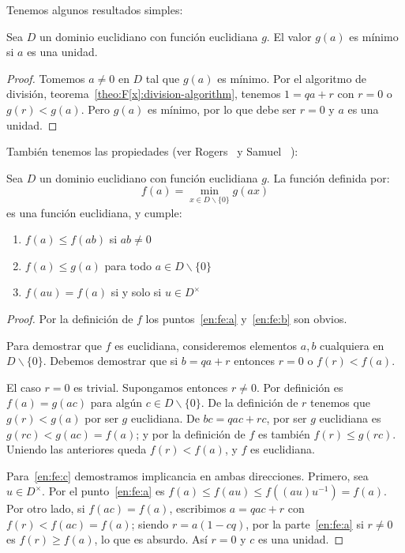   Tenemos algunos resultados simples:
  \begin{theorem}
    \label{theo:ED:g-minimo=>unidad}
    Sea \(D\) un dominio euclidiano con función euclidiana \(g\).
    El valor \(g(a)\) es mínimo si \(a\) es una unidad.
  \end{theorem}
  \begin{proof}
    Tomemos \(a \ne 0\) en \(D\) tal que \(g(a)\) es mínimo.
    Por el algoritmo de división,
    teorema~\ref{theo:F[x]:division-algorithm},
    tenemos \(1 = q a + r\) con \(r = 0\) o \(g(r) < g(a)\).
    Pero \(g(a)\) es mínimo,
    por lo que debe ser \(r = 0\)
    y \(a\) es una unidad.
  \end{proof}
  También tenemos las propiedades
  (ver Rogers~%
    \cite{rogers71:_axiom_euclidean_domain}
   y Samuel~%
    \cite{samuel71:_about_euclidean_rings}):
  \begin{theorem}
    \label{theo:ED:propiedades-f}
    Sea \(D\) un dominio euclidiano
    con función euclidiana \(g\).
    La función definida por:
    \begin{equation*}
      f(a)
	= \min_{x \in D \smallsetminus \{0\}} g(a x)
    \end{equation*}
    es una función euclidiana,
    y cumple:
    \begin{enumerate}[label=(\alph{*})]
    \item
      \label{en:fe:a}
      \(f(a) \le f(a b)\) si \(a b \ne 0\)
    \item
      \label{en:fe:b}
      \(f(a) \le g(a)\) para todo \(a \in D \smallsetminus \{0\}\)
    \item
      \label{en:fe:c}
      \(f(a u) = f(a)\) si y solo si \(u \in D^\times\)
    \end{enumerate}
  \end{theorem}
  \begin{proof}
    Por la definición de \(f\)
    los puntos~\ref{en:fe:a} y~\ref{en:fe:b} son obvios.

    Para demostrar que \(f\) es euclidiana,
    consideremos elementos \(a, b\)
    cualquiera en \(D \smallsetminus \{0\}\).
    Debemos demostrar que si \(b = q a + r\)
    entonces \(r = 0\) o \(f(r) < f(a)\).

    El caso \(r = 0\) es trivial.
    Supongamos entonces \(r \ne 0\).
    Por definición
    es \(f(a) = g(a c)\)
    para algún \(c \in D \smallsetminus \{0\}\).
    De la definición de \(r\) tenemos que \(g(r) < g(a)\)
    por ser \(g\) euclidiana.
    De \(b c = q a c + r c\),
    por ser \(g\) euclidiana es \(g(r c) < g(a c) = f(a)\);
    y por la definición de \(f\) es también \(f(r) \le g(r c)\).
    Uniendo las anteriores queda \(f(r) < f(a)\),
    y \(f\) es euclidiana.

    Para~\ref{en:fe:c} demostramos implicancia en ambas direcciones.
    Primero,
    sea \(u \in D^\times\).
    Por el punto~\ref{en:fe:a}
    es \(f(a) \le f(a u) \le f((a u) u^{-1}) = f(a)\).
    Por otro lado,
    si \(f(a c) = f(a)\),
    escribimos \(a = q a c + r\) con \(f(r) < f(a c) = f(a)\);
    siendo \(r = a (1 - c q)\),
    por la parte~\ref{en:fe:a}
    si \(r \ne 0\) es \(f(r) \ge f(a)\),
    lo que es absurdo.
    Así \(r = 0\) y \(c\) es una unidad.
  \end{proof}
